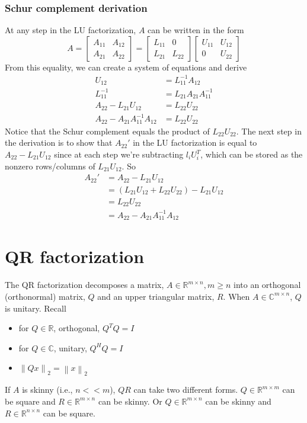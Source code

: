 \documentclass{article}
\newcommand{\norm}[2]{\left\lVert#1\right\rVert_#2}
\begin{document}
\subsubsection{Schur complement derivation}
At any step in the LU factorization, $A$ can be written in the form
\begin{equation*}
    A = \begin{bmatrix} A_{11} & A_{12}\\ A_{21} & A_{22}\end{bmatrix} = \begin{bmatrix} L_{11} & 0\\ L_{21} & L_{22}\end{bmatrix}
    \begin{bmatrix} U_{11} & U_{12}\\ 0 & U_{22}\end{bmatrix}
\end{equation*}
From this equality, we can create a system of equations and derive
\begin{align*}
    U_{12} &= L_{11}^{-1}A_{12}\\
    L_{11}^{-1} &= L_{21}A_{21}A_{11}^{-1}\\
    A_{22} - L_{21}U_{12} &= L_{22}U_{22}\\
    A_{22} - A_{21}A_{11}^{-1}A_{12} &= L_{22}U_{22}
\end{align*}
Notice that the Schur complement equals the product of $L_{22}U_{22}$. The next step in the derivation is to show that $A_{22}'$ in the LU factorization is equal to $A_{22} - L_{21}U_{12}$ since at each step we're subtracting $l_iU_i^T$, which can be stored as the nonzero rows/columns of $L_{21}U_{12}$. So
\begin{align*}
    A_{22}' &= A_{22} - L_{21}U_{12} \\
    &= (L_{21}U_{12} + L_{22}U_{22}) - L_{21}U_{12}\\
    &= L_{22}U_{22}\\
    &= A_{22} - A_{21}A_{11}^{-1}A_{12}
\end{align*}

\section{QR factorization}
The QR factorization decomposes a matrix, $A \in \mathbb{R}^{m \times n}, m \geq n$ into an orthogonal (orthonormal) matrix, $Q$ and an upper triangular matrix, $R$. When $A \in \mathbb{C}^{m \times n}$, $Q$ is unitary. Recall
\begin{itemize}
    \item for $Q \in \mathbb{R}$, orthogonal, $Q^TQ = I$
    \item for $Q \in \mathbb{C}$, unitary, $Q^HQ = I$
    \item $\norm{Qx}{2} = \norm{x}{2}$
\end{itemize}
If $A$ is skinny (i.e., $n << m$), $QR$ can take two different forms. $Q \in \mathbb{R}^{m \times m}$ can be square and $R \in \mathbb{R}^{m \times n}$ can be skinny. Or $Q \in \mathbb{R}^{m \times n}$ can be skinny and $R \in \mathbb{R}^{n \times n}$ can be square.
\end{document}
